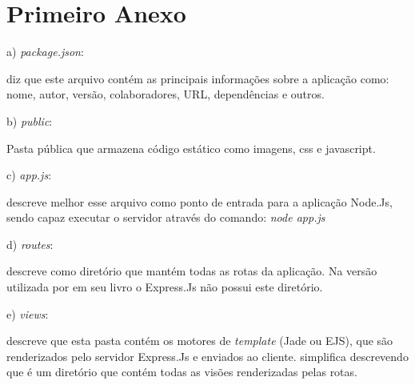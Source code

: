 \chapter{Primeiro Anexo}
\label{primeiro-anexo}
\vspace{-1.9cm}


\begin{compactitem}
  \item[a)] \textit{package.json}:
  
   diz que este arquivo contém as principais informações sobre a aplicação como: 
  nome, autor, versão, colaboradores, URL, dependências e outros.
  
  \item[b)] \textit{public}:
  
  Pasta pública que armazena código estático como imagens, css e javascript. \cite{pereira}
  
  \item[c)] \textit{app.js}:
  
   descreve melhor esse arquivo como ponto de entrada para a aplicação Node.Js, 
  sendo capaz executar o servidor através do comando: \textit{node app.js}
  
  \item[d)] \textit{routes}:
  
   descreve como diretório que mantém todas as rotas da aplicação. 
  Na versão utilizada por  em seu livro o Express.Js não possui este diretório.
  
  \item[e)] \textit{views}: 
  
   descreve que esta pasta contém os motores de \textit{template} (Jade ou EJS), 
  que são renderizados pelo servidor Express.Js e enviados ao cliente. 
  simplifica descrevendo que é um diretório que contém todas as visões renderizadas pelas rotas.
  
\end{compactitem}

